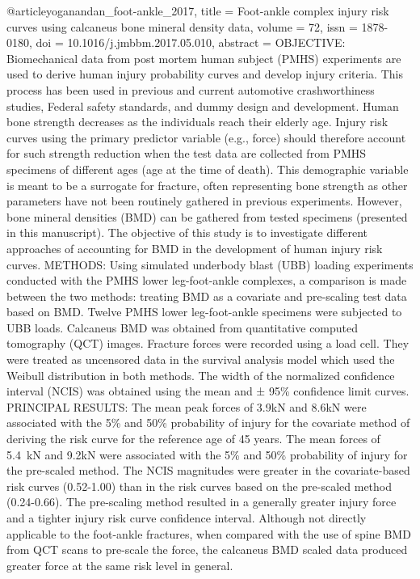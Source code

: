 @article{yoganandan_foot-ankle_2017,
	title = {Foot-ankle complex injury risk curves using calcaneus bone mineral density data},
	volume = {72},
	issn = {1878-0180},
	doi = {10.1016/j.jmbbm.2017.05.010},
	abstract = {OBJECTIVE: Biomechanical data from post mortem human subject (PMHS) experiments are used to derive human injury probability curves and develop injury criteria. This process has been used in previous and current automotive crashworthiness studies, Federal safety standards, and dummy design and development. Human bone strength decreases as the individuals reach their elderly age. Injury risk curves using the primary predictor variable (e.g., force) should therefore account for such strength reduction when the test data are collected from PMHS specimens of different ages (age at the time of death). This demographic variable is meant to be a surrogate for fracture, often representing bone strength as other parameters have not been routinely gathered in previous experiments. However, bone mineral densities (BMD) can be gathered from tested specimens (presented in this manuscript). The objective of this study is to investigate different approaches of accounting for BMD in the development of human injury risk curves.
METHODS: Using simulated underbody blast (UBB) loading experiments conducted with the PMHS lower leg-foot-ankle complexes, a comparison is made between the two methods: treating BMD as a covariate and pre-scaling test data based on BMD. Twelve PMHS lower leg-foot-ankle specimens were subjected to UBB loads. Calcaneus BMD was obtained from quantitative computed tomography (QCT) images. Fracture forces were recorded using a load cell. They were treated as uncensored data in the survival analysis model which used the Weibull distribution in both methods. The width of the normalized confidence interval (NCIS) was obtained using the mean and ± 95\% confidence limit curves.
PRINCIPAL RESULTS: The mean peak forces of 3.9kN and 8.6kN were associated with the 5\% and 50\% probability of injury for the covariate method of deriving the risk curve for the reference age of 45 years. The mean forces of 5.4 kN and 9.2kN were associated with the 5\% and 50\% probability of injury for the pre-scaled method. The NCIS magnitudes were greater in the covariate-based risk curves (0.52-1.00) than in the risk curves based on the pre-scaled method (0.24-0.66). The pre-scaling method resulted in a generally greater injury force and a tighter injury risk curve confidence interval. Although not directly applicable to the foot-ankle fractures, when compared with the use of spine BMD from QCT scans to pre-scale the force, the calcaneus BMD scaled data produced greater force at the same risk level in general.
}}
